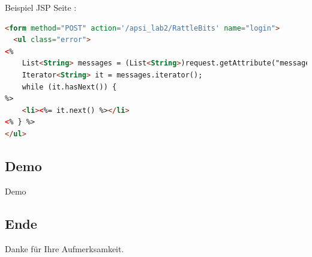 \documentclass{beamer}
\begin{document}
\begin{frame}[fragile]
Beispiel JSP Seite :
\begin{lstlisting}[language=html]
  <form method="POST" action='/apsi_lab2/RattleBits' name="login">
  <ul class="error">
<%
    List<String> messages = (List<String>)request.getAttribute("messages");
	Iterator<String> it = messages.iterator();
    while (it.hasNext()) {
%>
	<li><%= it.next() %></li>
<% } %>
</ul>

\end{lstlisting}
\end{frame}

\begin{frame}
\section{Demo}
 \huge Demo
\end{frame}

\begin{frame}
\section*{Ende}
 \huge Danke für Ihre Aufmerksamkeit.
\end{frame}
\end{document}
